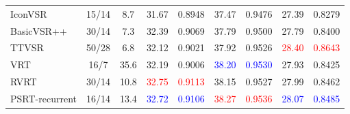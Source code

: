 \begin{table*}[!htbp]
{\begin{tabular}{l|c|c||cc|cc|cc}
    IconVSR &  15/14 & 8.7 & 31.67 & 0.8948 & 37.47 & 0.9476 & 27.39 & 0.8279 \\
    BasicVSR++ &  30/14 & 7.3  & 32.39 & 0.9069 &  37.79 & 0.9500 & 27.79 & 0.8400\\
    TTVSR & 50/28&6.8&32.12&0.9021&37.92&0.9526&\textcolor{red}{28.40}&\textcolor{red}{0.8643}\\
    VRT  &  16/7 & 35.6 & 32.19 & 0.9006 & \textcolor{blue}{38.20} & \textcolor{blue}{0.9530} & 27.93 & 0.8425\\
    RVRT  & 30/14 &  10.8 & \textcolor{red}{32.75} & \textcolor{red}{0.9113} & 38.15 & 0.9527 & 27.99 & 0.8462 \\
    PSRT-recurrent  &  16/14 & 13.4 & \textcolor{blue}{32.72} & \textcolor{blue}{0.9106} & \textcolor{red}{38.27} & \textcolor{red}{0.9536} &\textcolor{blue}{28.07}& \textcolor{blue}{0.8485}\\
    \bottomrule
  \end{tabular}}
\end{table*}
